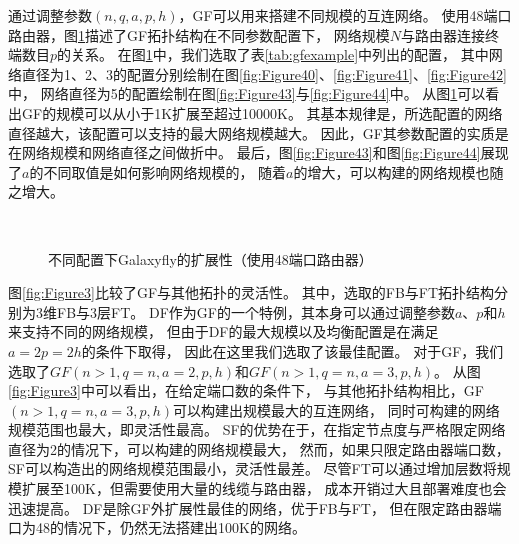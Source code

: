 通过调整参数$(n,q,a,p,h)$，GF可以用来搭建不同规模的互连网络。
使用48端口路由器，图\ref{fig:Figure4}描述了GF拓扑结构在不同参数配置下，
网络规模$N$与路由器连接终端数目$p$的关系。
在图\ref{fig:Figure4}中，我们选取了表\ref{tab:gfexample}中列出的配置，
其中网络直径为1、2、3的配置分别绘制在图\ref{fig:Figure40}、\ref{fig:Figure41}、\ref{fig:Figure42}中，
网络直径为5的配置绘制在图\ref{fig:Figure43}与\ref{fig:Figure44}中。
从图\ref{fig:Figure4}可以看出GF的规模可以从小于1K扩展至超过10000K。
其基本规律是，所选配置的网络直径越大，该配置可以支持的最大网络规模越大。
因此，GF其参数配置的实质是在网络规模和网络直径之间做折中。
最后，图\ref{fig:Figure43}和图\ref{fig:Figure44}展现了$a$的不同取值是如何影响网络规模的，
随着$a$的增大，可以构建的网络规模也随之增大。

\begin{figure}[t]
  \centering
  \begin{minipage}[t]{\textwidth}
   \centering
   \\

   \caption{不同配置下Galaxyfly的扩展性（使用48端口路由器）}
  \label{fig:Figure4}
  \end{minipage}
\end{figure}

图\ref{fig:Figure3}比较了GF与其他拓扑的灵活性。
其中，选取的FB与FT拓扑结构分别为3维FB与3层FT。
DF作为GF的一个特例，其本身可以通过调整参数$a$、$p$和$h$
来支持不同的网络规模，
但由于DF的最大规模以及均衡配置是在满足$a = 2p = 2h$的条件下取得，
因此在这里我们选取了该最佳配置。
对于GF，我们选取了$GF(n>1,q=n,a=2,p,h)$和$GF(n>1,q=n,a=3,p,h)$。
从图\ref{fig:Figure3}中可以看出，在给定端口数的条件下，
与其他拓扑结构相比，GF$(n>1,q=n,a=3,p,h)$可以构建出规模最大的互连网络，
同时可构建的网络规模范围也最大，即灵活性最高。
SF的优势在于，在指定节点度与严格限定网络直径为2的情况下，可以构建的网络规模最大，
然而，如果只限定路由器端口数，SF可以构造出的网络规模范围最小，灵活性最差。
尽管FT可以通过增加层数将规模扩展至100K，但需要使用大量的线缆与路由器，
成本开销过大且部署难度也会迅速提高。
DF是除GF外扩展性最佳的网络，优于FB与FT，
但在限定路由器端口为48的情况下，仍然无法搭建出100K的网络。

